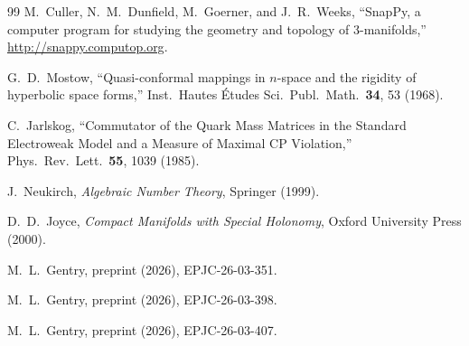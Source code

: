 \documentclass[11pt,a4paper]{article}
\begin{document}
\begin{thebibliography}{99}
M.~Culler, N.~M.~Dunfield, M.~Goerner, and J.~R.~Weeks,
``SnapPy, a computer program for studying the geometry and topology 
of 3-manifolds,''
\url{http://snappy.computop.org}.

G.~D.~Mostow,
``Quasi-conformal mappings in $n$-space and the rigidity of hyperbolic 
space forms,''
Inst.\ Hautes \'Etudes Sci.\ Publ.\ Math.\ \textbf{34}, 53 (1968).

C.~Jarlskog,
``Commutator of the Quark Mass Matrices in the Standard Electroweak 
Model and a Measure of Maximal CP Violation,''
Phys.\ Rev.\ Lett.\ \textbf{55}, 1039 (1985).

J.~Neukirch,
\emph{Algebraic Number Theory},
Springer (1999).

D.~D.~Joyce,
\emph{Compact Manifolds with Special Holonomy},
Oxford University Press (2000).


M.~L.~Gentry,
preprint (2026), EPJC-26-03-351.

M.~L.~Gentry,
preprint (2026), EPJC-26-03-398.

M.~L.~Gentry,
preprint (2026), EPJC-26-03-407.
\end{thebibliography}
\end{document}

